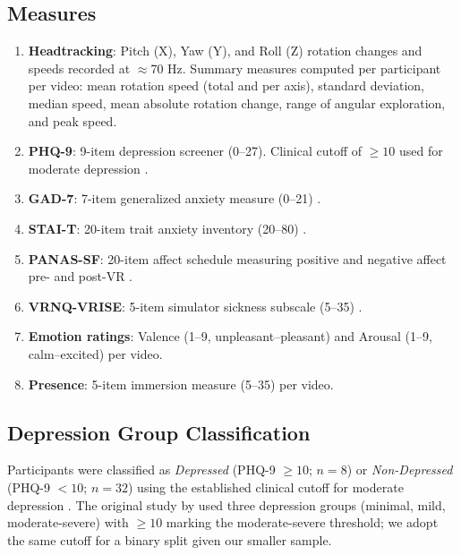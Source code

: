 \documentclass[12pt]{article}
\begin{document}
\subsection{Measures}
\begin{enumerate}
    \item \textbf{Headtracking}: Pitch (X), Yaw (Y), and Roll (Z) rotation changes and speeds recorded at $\approx$70 Hz. Summary measures computed per participant per video: mean rotation speed (total and per axis), standard deviation, median speed, mean absolute rotation change, range of angular exploration, and peak speed.
    \item \textbf{PHQ-9}: 9-item depression screener (0--27). Clinical cutoff of $\geq 10$ used for moderate depression \citep{kroenke2001phq9}.
    \item \textbf{GAD-7}: 7-item generalized anxiety measure (0--21) \citep{spitzer2006gad7}.
    \item \textbf{STAI-T}: 20-item trait anxiety inventory (20--80) \citep{spielberger1983stai}.
    \item \textbf{PANAS-SF}: 20-item affect schedule measuring positive and negative affect pre- and post-VR \citep{watson1988panas}.
    \item \textbf{VRNQ-VRISE}: 5-item simulator sickness subscale (5--35) \citep{kourtesis2019vrnq}.
    \item \textbf{Emotion ratings}: Valence (1--9, unpleasant--pleasant) and Arousal (1--9, calm--excited) per video.
    \item \textbf{Presence}: 5-item immersion measure (5--35) per video.
\end{enumerate}

\subsection{Depression Group Classification}
Participants were classified as \textit{Depressed} (PHQ-9 $\geq 10$; $n = 8$) or \textit{Non-Depressed} (PHQ-9 $< 10$; $n = 32$) using the established clinical cutoff for moderate depression \citep{kroenke2001phq9}. The original study by \citet{srivastava2025headscan} used three depression groups (minimal, mild, moderate-severe) with $\geq 10$ marking the moderate-severe threshold; we adopt the same cutoff for a binary split given our smaller sample.
\end{document}
